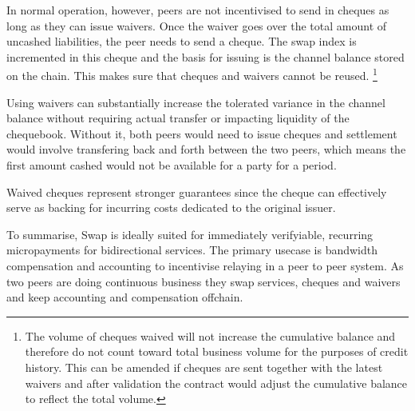 \documentclass[a4paper,10pt]{article}
\begin{document}
In normal operation, however, peers are not incentivised to send in cheques as
long as they can issue waivers. Once the waiver goes over
the total amount of uncashed liabilities, the peer needs to send a cheque.
The swap index is incremented in this cheque and the basis for issuing is the channel
balance stored on the chain. This makes sure that cheques and
waivers cannot be reused.%
%
\footnote{The volume of cheques waived will not increase the cumulative balance and therefore
do not count toward total business volume for the purposes of credit history.
This can be amended if cheques are sent together with the latest waivers
and after validation the contract would adjust the cumulative balance to reflect the total volume.}

Using waivers can substantially increase the tolerated variance in the channel balance
without requiring actual transfer or impacting liquidity of the chequebook.
Without it, both peers would need to issue cheques and settlement would involve
transfering back and forth between the two peers, which means the first amount cashed
would not be available for a party for a period.

Waived cheques represent stronger guarantees since the cheque can effectively serve
as backing for incurring costs dedicated to the original issuer.

To summarise, Swap is ideally suited for immediately verifyiable, recurring micropayments for bidirectional
services. The primary usecase is bandwidth compensation and accounting to incentivise
relaying in a peer to peer system. As two peers are doing continuous business
they swap services, cheques and waivers and keep accounting and compensation offchain.
\end{document}
